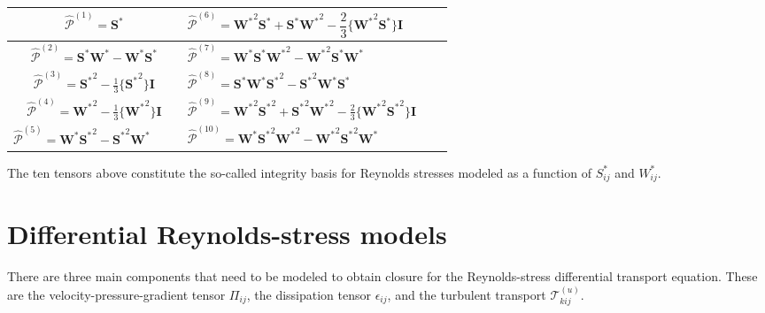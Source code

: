 \documentclass[oneside,a4paper,11pt]{report}
\newcommand{\Stau}{S^*}
\newcommand{\Wtau}{W^*}
\begin{document}
\begin{center}
\begin{tabular} {| Sl | Sl | }
\hline
$\hat{\boldsymbol{\mathcal{P}}}^{(1)} = \mathbf{\Stau}$ & $\hat{\boldsymbol{\mathcal{P}}}^{(6)} = \mathbf{\Wtau}^2 \mathbf{\Stau} + \mathbf{\Stau} \mathbf{\Wtau}^2 - \dfrac{2}{3} \{ \mathbf{\Wtau}^2 \mathbf{\Stau} \} \mathbf{I}$ \\
\hline
$\hat{\boldsymbol{\mathcal{P}}}^{(2)} = \mathbf{\Stau} \mathbf{\Wtau} - \mathbf{\Wtau} \mathbf{\Stau}$ & $\hat{\boldsymbol{\mathcal{P}}}^{(7)} = \mathbf{\Wtau} \mathbf{\Stau} \mathbf{\Wtau}^2 - \mathbf{\Wtau}^2 \mathbf{\Stau} \mathbf{\Wtau}$ \\
\hline
$\hat{\boldsymbol{\mathcal{P}}}^{(3)} = \mathbf{\Stau}^2 - \frac{1}{3} \{\mathbf{\Stau}^2 \} \mathbf{I}  $ & $ \hat{\boldsymbol{\mathcal{P}}}^{(8)} = \mathbf{\Stau} \mathbf{\Wtau} \mathbf{\Stau}^2 - \mathbf{\Stau}^2 \mathbf{\Wtau} \mathbf{\Stau} $ \\
\hline
$ \hat{\boldsymbol{\mathcal{P}}}^{(4)} = \mathbf{\Wtau}^2 - \frac{1}{3} \{\mathbf{\Wtau}^2 \} \mathbf{I} $ & $ \hat{\boldsymbol{\mathcal{P}}}^{(9)} = \mathbf{\Wtau}^2 \mathbf{\Stau}^2 + \mathbf{\Stau}^2 \mathbf{\Wtau}^2 - \frac{2}{3} \{ \mathbf{\Wtau}^2 \mathbf{\Stau}^2 \} \mathbf{I} $ \\
\hline
$ \hat{\boldsymbol{\mathcal{P}}}^{(5)} = \mathbf{\Wtau} \mathbf{\Stau}^2 - \mathbf{\Stau}^2 \mathbf{\Wtau} \qquad$ & $ \hat{\boldsymbol{\mathcal{P}}}^{(10)} = \mathbf{\Wtau} \mathbf{\Stau}^2 \mathbf{\Wtau}^2 - \mathbf{\Wtau}^2 \mathbf{\Stau}^2 \mathbf{\Wtau}$ \\
\hline
\end{tabular}
\end{center}

The ten tensors above constitute the so-called integrity basis for Reynolds stresses modeled as a function of $\Stau_{ij}$ and $\Wtau_{ij}$.

\section{Differential Reynolds-stress models}

There are three main components that need to be modeled to obtain closure for the Reynolds-stress differential transport equation. These are the velocity-pressure-gradient tensor $\Pi_{ij}$, the dissipation tensor $\epsilon_{ij}$, and the turbulent transport $\mathcal{T}^{(u)}_{kij}$.
\end{document}
